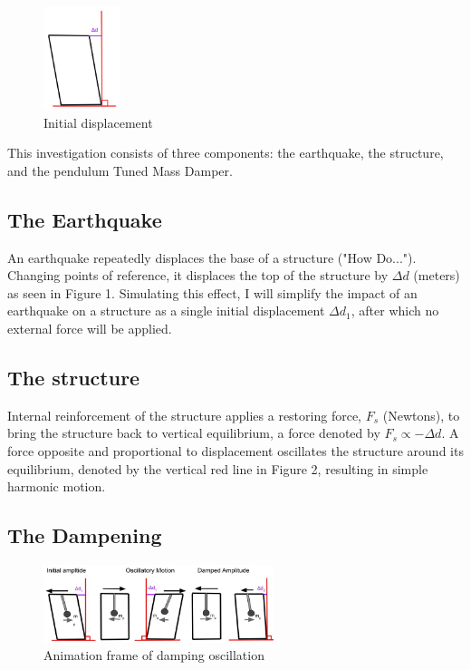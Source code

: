 \documentclass[11pt]{article}
\begin{document}
\begin{figure}
\vspace{-15pt}
\centering
\includegraphics[width=0.2\textwidth]{img/fig1.jpg}
\caption{\label{fig:1}Initial displacement}
\vspace{-50pt}
\end{figure}

This investigation consists of three components: the earthquake, the structure, and the pendulum Tuned Mass Damper.

\subsection{The Earthquake}

An earthquake repeatedly displaces the base of a structure ("How Do..."). Changing points of reference, it displaces the top of the structure by $\Delta d$ (meters) as seen in Figure 1. Simulating this effect, I will simplify the impact of an earthquake on a structure as a single initial displacement $\Delta d_1$, after which no external force will be applied.


\subsection{The structure}

Internal reinforcement of the structure applies a restoring force, $F_s$ (Newtons), to bring the structure back to vertical equilibrium, a force denoted by $F_s \propto -\Delta d$. A force opposite and proportional to displacement oscillates the structure around its equilibrium, denoted by the vertical red line in Figure 2, resulting in simple harmonic motion. 



\subsection{The Dampening}

\begin{figure}
\centering
\includegraphics[width=0.6\textwidth]{img/fig2.jpg}
\caption{\label{fig:2}Animation frame of damping oscillation}
\vspace{-10pt}
\end{figure}
\end{document}
